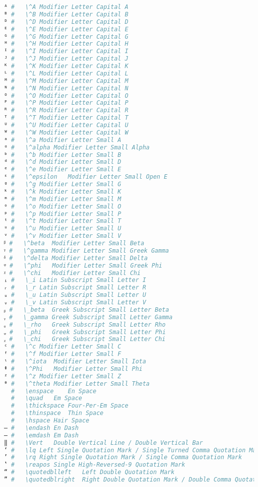 \begin{lstlisting}[language=Julia, linewidth=\textwidth]
ᴬ #   \^A Modifier Letter Capital A
ᴮ #   \^B Modifier Letter Capital B
ᴰ #   \^D Modifier Letter Capital D
ᴱ #   \^E Modifier Letter Capital E
ᴳ #   \^G Modifier Letter Capital G
ᴴ #   \^H Modifier Letter Capital H
ᴵ #   \^I Modifier Letter Capital I
ᴶ #   \^J Modifier Letter Capital J
ᴷ #   \^K Modifier Letter Capital K
ᴸ #   \^L Modifier Letter Capital L
ᴹ #   \^M Modifier Letter Capital M
ᴺ #   \^N Modifier Letter Capital N
ᴼ #   \^O Modifier Letter Capital O
ᴾ #   \^P Modifier Letter Capital P
ᴿ #   \^R Modifier Letter Capital R
ᵀ #   \^T Modifier Letter Capital T
ᵁ #   \^U Modifier Letter Capital U
ᵂ #   \^W Modifier Letter Capital W
ᵃ #   \^a Modifier Letter Small A
ᵅ #   \^alpha Modifier Letter Small Alpha
ᵇ #   \^b Modifier Letter Small B
ᵈ #   \^d Modifier Letter Small D
ᵉ #   \^e Modifier Letter Small E
ᵋ #   \^epsilon   Modifier Letter Small Open E
ᵍ #   \^g Modifier Letter Small G
ᵏ #   \^k Modifier Letter Small K
ᵐ #   \^m Modifier Letter Small M
ᵒ #   \^o Modifier Letter Small O
ᵖ #   \^p Modifier Letter Small P
ᵗ #   \^t Modifier Letter Small T
ᵘ #   \^u Modifier Letter Small U
ᵛ #   \^v Modifier Letter Small V
ᵝ #   \^beta  Modifier Letter Small Beta
ᵞ #   \^gamma Modifier Letter Small Greek Gamma
ᵟ #   \^delta Modifier Letter Small Delta
ᵠ #   \^phi   Modifier Letter Small Greek Phi
ᵡ #   \^chi   Modifier Letter Small Chi
ᵢ #   \_i Latin Subscript Small Letter I
ᵣ #   \_r Latin Subscript Small Letter R
ᵤ #   \_u Latin Subscript Small Letter U
ᵥ #   \_v Latin Subscript Small Letter V
ᵦ #   \_beta  Greek Subscript Small Letter Beta
ᵧ #   \_gamma Greek Subscript Small Letter Gamma
ᵨ #   \_rho   Greek Subscript Small Letter Rho
ᵩ #   \_phi   Greek Subscript Small Letter Phi
ᵪ #   \_chi   Greek Subscript Small Letter Chi
ᶜ #   \^c Modifier Letter Small C
ᶠ #   \^f Modifier Letter Small F
ᶥ #   \^iota  Modifier Letter Small Iota
ᶲ #   \^Phi   Modifier Letter Small Phi
ᶻ #   \^z Modifier Letter Small Z
ᶿ #   \^theta Modifier Letter Small Theta
  #   \enspace    En Space
  #   \quad   Em Space
  #   \thickspace Four-Per-Em Space
  #   \thinspace  Thin Space
  #   \hspace Hair Space
– #   \endash En Dash
— #   \emdash Em Dash
‖ #   \Vert   Double Vertical Line / Double Vertical Bar
‘ #   \lq Left Single Quotation Mark / Single Turned Comma Quotation Mark
’ #   \rq Right Single Quotation Mark / Single Comma Quotation Mark
‛ #   \reapos Single High-Reversed-9 Quotation Mark
“ #   \quotedblleft   Left Double Quotation Mark
” #   \quotedblright  Right Double Quotation Mark / Double Comma Quotation Mark

\end{lstlisting}
